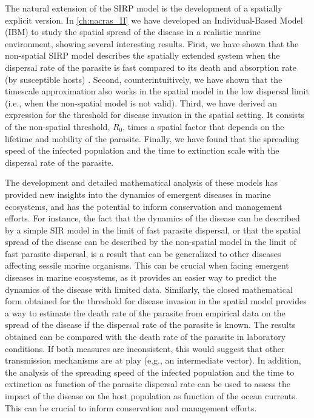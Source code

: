 The natural extension of the SIRP model is the development of a spatially
explicit version. In \cref{ch:nacras_II} we have developed an Individual-Based
Model (IBM) to study the spatial spread of the disease in a realistic marine
environment, showing several interesting results. First, we have shown that the
non-spatial SIRP model describes the spatially extended system when the
dispersal rate of the parasite is fast compared to its death and absorption
rate (by susceptible hosts) \cite{GimenezRomero_2022_RSos}. Second,
counterintuitively, we have shown that the timescale approximation also works
in the spatial model in the low dispersal limit (i.e., when the non-spatial
model is not valid). Third, we have derived an expression for the threshold for
disease invasion in the spatial setting. It consists of the non-spatial
threshold, $R_0$, times a spatial factor that depends on the lifetime and
mobility of the parasite. Finally, we have found that the spreading speed of
the infected population and the time to extinction scale with the dispersal
rate of the parasite.

The development and detailed mathematical analysis of these models has provided
new insights into the dynamics of emergent diseases in marine ecosystems, and
has the potential to inform conservation and management efforts. For instance,
the fact that the dynamics of the disease can be described by a simple SIR
model in the limit of fast parasite dispersal, or that the spatial spread of
the disease can be described by the non-spatial model in the limit of fast
parasite dispersal, is a result that can be generalized to other diseases
affecting sessile marine organisms. This can be crucial when facing emergent
diseases in marine ecosystems, as it provides an easier way to predict the
dynamics of the disease with limited data. Similarly, the closed mathematical
form obtained for the threshold for disease invasion in the spatial model
provides a way to estimate the death rate of the parasite from empirical data
on the spread of the disease if the dispersal rate of the parasite is known.
The results obtained can be compared with the death rate of the parasite in
laboratory conditions. If both measures are inconsistent, this would suggest
that other transmission mechanisms are at play (e.g., an intermediate vector).
In addition, the analysis of the spreading speed of the infected population and
the time to extinction as function of the parasite dispersal rate can be used
to assess the impact of the disease on the host population as function of the
ocean currents. This can be crucial to inform conservation and management
efforts.

